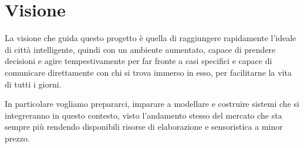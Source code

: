 \section{Visione}

La visione che guida questo progetto è quella di raggiungere rapidamente l'ideale di città intelligente, quindi con un ambiente aumentato, capace di prendere decisioni e agire tempestivamente per far fronte a casi specifici e capace di comunicare direttamente con chi si trova immerso in esso, per facilitarne la vita di tutti i giorni. 

In particolare vogliamo prepararci, imparare a modellare e costruire sistemi che si integreranno in questo contesto, visto l'andamento stesso del mercato che sta sempre più rendendo disponibili risorse di elaborazione e sensoristica a minor prezzo.
